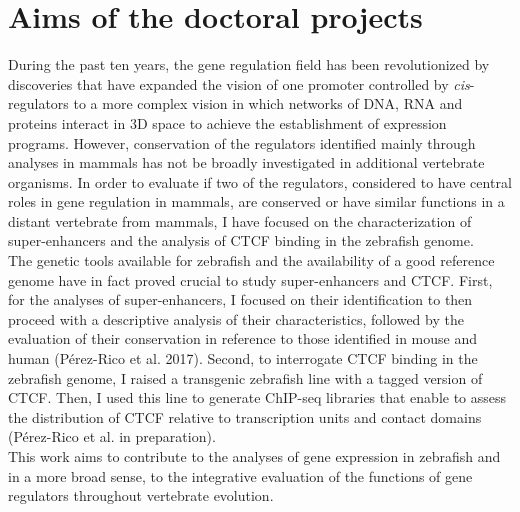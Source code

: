 \section{Aims of the doctoral projects}

During the past ten years, the gene regulation field has been revolutionized by discoveries that have expanded the vision of one promoter controlled by \textit{cis}-regulators to a more complex vision in which networks of DNA, RNA and proteins interact in 3D space to achieve the establishment of expression programs. However, conservation of the regulators identified mainly through analyses in mammals has not be broadly investigated in additional vertebrate organisms. In order to evaluate if two of the regulators, considered to have central roles in gene regulation in mammals, are conserved or have similar functions in a distant vertebrate from mammals, I have focused on the characterization of super-enhancers and the analysis of CTCF binding in the zebrafish genome.\\

The genetic tools available for zebrafish and the availability of a good reference genome have in fact proved crucial to study super-enhancers and CTCF. First, for the analyses of super-enhancers, I focused on their identification to then proceed with a descriptive analysis of their characteristics, followed by the evaluation of their conservation in reference to those identified in mouse and human (Pérez-Rico et al. 2017). Second, to interrogate CTCF binding in the zebrafish genome, I raised a transgenic zebrafish line with a tagged version of CTCF. Then, I used this line to generate ChIP-seq libraries that enable to assess the distribution of CTCF relative to transcription units and contact domains (Pérez-Rico et al. in preparation).\\

This work aims to contribute to the analyses of gene expression in zebrafish and in a more broad sense, to the integrative evaluation of the functions of gene regulators throughout vertebrate evolution.\\



